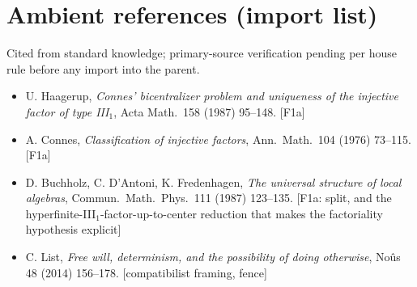 \documentclass[11pt]{article}
\begin{document}
\section*{Ambient references (import list)}
\noindent Cited from standard knowledge; primary-source verification pending
per house rule before any import into the parent.
\begin{itemize}
\item U. Haagerup, \emph{Connes' bicentralizer problem and uniqueness of the
injective factor of type III$_1$}, Acta Math.\ 158 (1987) 95--148. [F1a]
\item A. Connes, \emph{Classification of injective factors}, Ann.\ Math.\ 104
(1976) 73--115. [F1a]
\item D. Buchholz, C. D'Antoni, K. Fredenhagen, \emph{The universal structure
of local algebras}, Commun.\ Math.\ Phys.\ 111 (1987) 123--135. [F1a: split,
and the hyperfinite-III$_1$-factor-up-to-center reduction that makes the
factoriality hypothesis explicit]
\item C. List, \emph{Free will, determinism, and the possibility of doing
otherwise}, No\^us 48 (2014) 156--178. [compatibilist framing, fence]
\end{itemize}
\end{document}
